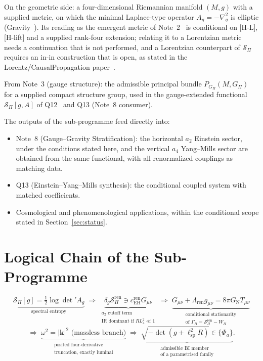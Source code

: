 \documentclass[11pt,a4paper]{article}
\theoremstyle{definition}
\newcommand{\SPI}{\mathcal{S}_\Pi}
\newcommand{\Ag}{A_g}
\newcommand{\lsp}{\ell_{\mathrm{sp}}}
\newcommand{\GN}{G_{\mathrm{N}}}
\newcommand{\cEH}{c_{\mathrm{EH}}}
\begin{document}
    On the geometric side: a four-dimensional Riemannian manifold $(M,g)$ with a supplied metric, on which the
    minimal Laplace-type operator $A_g = -\nabla_g^2$ is elliptic (Gravity~\cite{Beau2026h}).
    Its reading as the emergent metric of Note~2~\cite{Beau2026egnote} is conditional on [H-L], [H-lift] and a
    supplied rank-four extension; relating it to a Lorentzian metric needs a continuation that is not performed,
    and a Lorentzian counterpart of $\SPI$ requires an in-in construction that is open, as stated in the
    Lorentz/\allowbreak CausalPropagation paper~\cite{Beau2026i}.

    From Note~3 (gauge structure): the admissible principal bundle $P_{G_\Pi}(M, G_\Pi)$ for a supplied
    compact structure group, used in the gauge-extended functional $\SPI[g, A]$ of Q12~\cite{Beau2026q12} and Q13
    (Note~8 consumer).

    \medskip
    The outputs of the sub-programme feed directly into:
    \begin{itemize}
      \item Note~8 (Gauge--Gravity Stratification): the horizontal $a_2$ Einstein sector, under the conditions
      stated here, and the vertical $a_4$ Yang--Mills sector are obtained from the same functional, with all
      renormalized couplings as matching data.
      \item Q13 (Einstein--Yang--Mills synthesis): the conditional coupled system with
      matched coefficients.
      \item Cosmological and phenomenological applications, within the conditional scope
      stated in Section~\ref{sec:status}.
    \end{itemize}

  \section{Logical Chain of the Sub-Programme}
    \label{sec:chain}

    \begin{equation}
      \label{eq:chain}
      \underbrace{\SPI[g] = \tfrac{1}{2}\log\det' \Ag}_{\text{spectral entropy}}
      \;\Longrightarrow\;
      \underbrace{\delta_g\SPI^{\mathrm{ren}} \ni \cEH^{\mathrm{ren}}
        G_{\mu\nu}}_{\substack{a_2\text{ cutoff term} \\
        \text{IR dominant if } RL_4^2 \ll 1}}
      \;\Longrightarrow\;
      \underbrace{G_{\mu\nu} + \Lambda_{\mathrm{ren}} g_{\mu\nu} =
        8\pi\GN T_{\mu\nu}}_{\substack{\text{conditional stationarity} \\
        \text{of } \Gamma_\Pi = \SPI^{\mathrm{ren}} - W_\Pi}}
    \end{equation}
    \[
      \Longrightarrow\;
      \underbrace{\omega^2 = |\mathbf{k}|^2 \text{ (massless
        branch)}}_{\substack{\text{posited four-derivative} \\
        \text{truncation, exactly luminal}}}
      \;\Longrightarrow\;
      \underbrace{\sqrt{-\det(g + \lsp^2 R)} \in
        \{\Phi_a\}}_{\substack{\text{admissible BI member} \\
        \text{of a parametrised family}}}.
    \]
\end{document}
